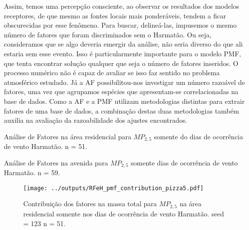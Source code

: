 Assim, temos uma percepção consciente, ao observar os resultados dos modelos 
receptores, de que mesmo as fontes locais mais ponderáveis, tendem a ficar 
obscurecidas por esse fenômeno.
Para buscar, delineá-las, impusemos o mesmo número de fatores que foram 
discriminados sem o Harmatão. Ou seja, consideramos que se algo deveria emergir 
da análise, não seria diverso do que ali estaria sem esse evento. 
Isso é particularmente importante para o modelo PMF, que tenta encontrar 
solução qualquer que seja o número de fatores inseridos. O processo numérico não
é capaz de avaliar se isso faz sentido no problema atmosférico estudado. 
Já a AF possibilitou-nos investigar um número razoável de fatores, uma vez que 
agrupamos espécies que apresentam-se correlacionadas na base de dados. 
Como a AF e a PMF utilizam metodologias 
distintas para extrair fatores de uma base de dados, a combinação destas duas 
metodologias também auxilia na avaliação da razoabilidade dos ajustes encontrados. 

\newpage
\begin{table}[H]
  \centering
  
  \caption{Análise de Fatores na área residencial para $MP_{2,5}$
           somente do dias de ocorrência de vento Harmatão. n = 51.
          \label{table:AF_RFeH5}}
\end{table}

\begin{table}[H]
  \centering
  
  \caption{Análise de Fatores na avenida para $MP_{2,5}$
           somente dias de ocorrência de vento Harmatão. n = 59.
          \label{table:AF_TFeH5}}
\end{table}

\begin{landscape}
  \begin{figure}
    \centering
    \begin{minipage}[b]{0.45\linewidth}
      \texttt{[image: ../outputs/RFeH\_pmf\_contribution\_pizza5.pdf]}
      \caption{Contribuição dos fatores na massa total para $MP_{2,5}$ na área
               residencial somente nos dias de ocorrência de vento Harmatão. seed = 123 n = 51.
               \label{fig:RFeH_contribution5}}
    \end{minipage}%
    \hspace{0.5cm}
    \begin{minipage}[b]{0.45\linewidth}
      
    \end{minipage}
  \end{figure}
\end{landscape}


